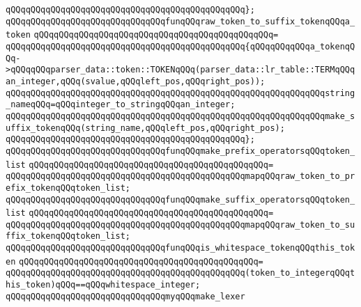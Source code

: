 \verb|qQQqqQQqqQQqqQQqqQQqqQQqqQQqqQQqqQQqqQQqqQQqqQQq};|\newline
\newline
\verb|qQQqqQQqqQQqqQQqqQQqqQQqqQQqqQQqfunqQQqraw_token_to_suffix_tokenqQQqa_token|\newline
\verb|qQQqqQQqqQQqqQQqqQQqqQQqqQQqqQQqqQQqqQQqqQQqqQQq=|\newline
\verb|qQQqqQQqqQQqqQQqqQQqqQQqqQQqqQQqqQQqqQQqqQQqqQQq{qQQqqQQqqQQqa_tokenqQQq->qQQqqQQqparser_data::token::TOKENqQQq(parser_data::lr_table::TERMqQQqan_integer,qQQq(svalue,qQQqleft_pos,qQQqright_pos));|\newline
\newline
\verb|qQQqqQQqqQQqqQQqqQQqqQQqqQQqqQQqqQQqqQQqqQQqqQQqqQQqqQQqqQQqqQQqstring_nameqQQq=qQQqinteger_to_stringqQQqan_integer;|\newline
\newline
\verb|qQQqqQQqqQQqqQQqqQQqqQQqqQQqqQQqqQQqqQQqqQQqqQQqqQQqqQQqqQQqqQQqmake_suffix_tokenqQQq(string_name,qQQqleft_pos,qQQqright_pos);|\newline
\verb|qQQqqQQqqQQqqQQqqQQqqQQqqQQqqQQqqQQqqQQqqQQqqQQq};|\newline
\newline
\verb|qQQqqQQqqQQqqQQqqQQqqQQqqQQqqQQqfunqQQqmake_prefix_operatorsqQQqtoken_list|\newline
\verb|qQQqqQQqqQQqqQQqqQQqqQQqqQQqqQQqqQQqqQQqqQQqqQQq=|\newline
\verb|qQQqqQQqqQQqqQQqqQQqqQQqqQQqqQQqqQQqqQQqqQQqqQQqmapqQQqraw_token_to_prefix_tokenqQQqtoken_list;|\newline
\newline
\verb|qQQqqQQqqQQqqQQqqQQqqQQqqQQqqQQqfunqQQqmake_suffix_operatorsqQQqtoken_list|\newline
\verb|qQQqqQQqqQQqqQQqqQQqqQQqqQQqqQQqqQQqqQQqqQQqqQQq=|\newline
\verb|qQQqqQQqqQQqqQQqqQQqqQQqqQQqqQQqqQQqqQQqqQQqqQQqmapqQQqraw_token_to_suffix_tokenqQQqtoken_list;|\newline
\newline
\verb|qQQqqQQqqQQqqQQqqQQqqQQqqQQqqQQqfunqQQqis_whitespace_tokenqQQqthis_token|\newline
\verb|qQQqqQQqqQQqqQQqqQQqqQQqqQQqqQQqqQQqqQQqqQQqqQQq=|\newline
\verb|qQQqqQQqqQQqqQQqqQQqqQQqqQQqqQQqqQQqqQQqqQQqqQQq(token_to_integerqQQqthis_token)qQQq==qQQqwhitespace_integer;|\newline
\newline
\verb|qQQqqQQqqQQqqQQqqQQqqQQqqQQqqQQqmyqQQqmake_lexer|\newline
